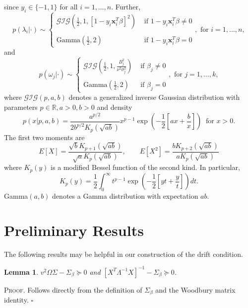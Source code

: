 \documentclass[12pt]{article}
\newtheorem{lemma}[theorem]{Lemma}
\newcounter{ProofCounter}
\newenvironment{Proof}{\stepcounter{ProofCounter}\textsc{Proof.}}{\hfill$\square$}
\begin{document}
since $y_i \in \{-1,1\}$ for all $i = 1,\dots, n$. Further,
\[
  p(\lambda_i|\cdot) \sim \left\{ \begin{array}{cl}
      \mathcal{GIG}\left( \frac{1}{2}, 1, [1 - y_i \bm{x}_i^T\beta]^2 \right) & \text{ if } 1-y_i \bm{x}_i^T \beta \neq 0 \\ \\
      \text{Gamma}\left( \frac{1}{2}, 2 \right) & \text{ if } 1 - y_i\bm{x}_i^T\beta = 0
  \end{array} \right., \text{ for } i=1,\dots, n,
\]
and 
\[
  p(\omega_j|\cdot) \sim \left\{ \begin{array}{cl}
      \mathcal{GIG}\left( \frac{1}{2}, 1, \frac{B_j^2}{\nu^2\sigma_j^2} \right) & \text{ if } \beta_j \neq 0 \\ \\
      \text{Gamma}\left( \frac{1}{2}, 2 \right) & \text{ if } \beta_j = 0
  \end{array} \right.,
  \text{ for } j=1,\dots,k,
\]
where $\mathcal{GIG}(p, a, b)$ denotes a generalized inverse Gaussian distribution with parameters $p \in \mathbb{R}, a > 0, b > 0$ and density
\[
  p(x|p, a, b) = \frac{a^{p/2}}{2b^{p/2}K_{p}(\sqrt{ab})}x^{p - 1}\exp\left( -\frac{1}{2}\left[ ax + \frac{b}{x} \right] \right) \ \text{ for } x > 0.
\]
The first two moments are
\[
  E[X] = \frac{\sqrt{b}K_{p+1}(\sqrt{ab})}{\sqrt{a}K_{p}(\sqrt{ab})}, \qquad E[X^2] = \frac{bK_{p+2}(\sqrt{ab})}{aK_{p}(\sqrt{ab})}
\]
where $K_{p}(y)$ is a modified Bessel function of the second kind. In particular, 
\begin{equation}
  K_p(y) = \frac{1}{2} \int_{0}^{\infty} t^{p-1}\exp\left( -\frac{1}{2}\left[yt + \frac{y}{t}\right] \right) dt.
  \label{eq1}
\end{equation}
Gamma$(a,b)$ denotes a Gamma distribution with expectation $ab$.


\section{Preliminary Results}

The following results may be helpful in our construction of the drift condition. \\

\begin{lemma}
  $v^2 \Omega \Sigma - \Sigma_{\beta} \succeq 0$ and $[X^T \Lambda^{-1}X]^{-1} - \Sigma_{\beta} \succeq 0$.
  \label{l1}
\end{lemma}
\begin{Proof}
  Follows directly from the definition of $\Sigma_{\beta}$ and the Woodbury matrix identity.
\end{Proof} \\
\end{document}
